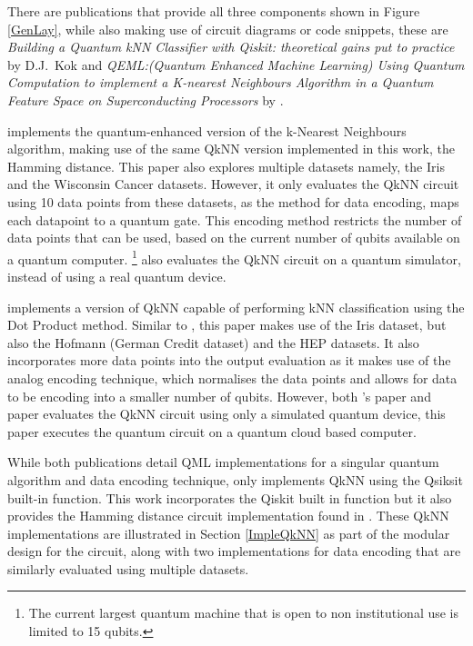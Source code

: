 There are publications that provide all three components shown in Figure \ref{GenLay}, while also making use of circuit diagrams or code snippets, these are \emph{Building a Quantum kNN Classifier with Qiskit: theoretical gains put to practice} by D.J.~Kok \citep{INGKOK} and \emph{ QEML:(Quantum Enhanced Machine Learning) Using Quantum Computation to implement a K-nearest Neighbours Algorithm in a Quantum Feature Space on Superconducting Processors} by \cite{sharmaQeml}.

\cite{sharmaQeml} implements the quantum-enhanced version of the k-Nearest Neighbours algorithm, making use of the same QkNN version implemented in this work, the Hamming distance. This paper also explores multiple datasets namely, the Iris and the Wisconsin Cancer datasets. However, it only evaluates the QkNN circuit using 10 data points from these datasets, as the method for data encoding, maps each datapoint to a quantum gate. This encoding method restricts the number of data points that can be used, based on the current number of qubits available on a quantum computer. \footnote{The current largest quantum machine that is open to non institutional use is limited to 15 qubits.}
\citeauthor{sharmaQeml} also evaluates the QkNN circuit on a quantum simulator, instead of using a real quantum device.


\citeauthor{INGKOK} implements a version of QkNN  capable of performing kNN classification using the Dot Product method. Similar to \citep{sharmaQeml}, this paper makes use of the Iris dataset, but also the Hofmann (German Credit dataset) and the HEP datasets. It also incorporates more data points into the output evaluation as it makes use of the analog encoding technique, which normalises the data points and allows for data to be encoding into a smaller number of qubits. However, both \citeauthor{sharmaQeml}'s paper and  \citeauthor{INGKOK} paper evaluates the QkNN circuit using only a simulated quantum device, this paper executes the quantum circuit on a quantum cloud based computer.


While both publications detail QML implementations for a singular quantum algorithm and data encoding technique, \citeauthor{INGKOK} only implements QkNN using the Qsiksit built-in function.  
This work incorporates the Qiskit built in function but it also provides the Hamming distance circuit implementation found in \citeauthor{sharmaQeml}. These QkNN implementations are illustrated in Section \ref{ImpleQkNN} as part of the modular design for the circuit, along with two implementations for data encoding that are similarly evaluated using multiple datasets. 





